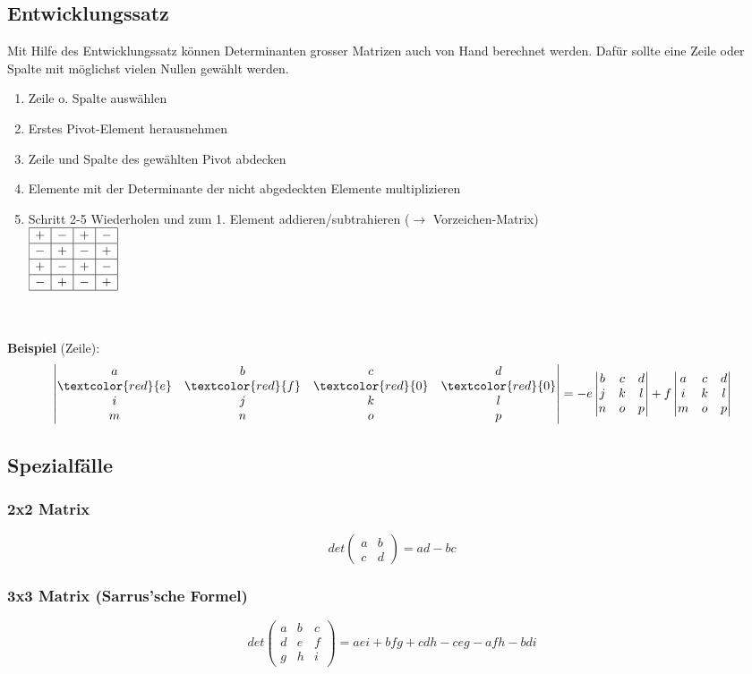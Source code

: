 \subsection{Entwicklungssatz}
Mit Hilfe des Entwicklungssatz können Determinanten grosser Matrizen auch von Hand berechnet werden. Dafür sollte eine Zeile oder Spalte mit möglichst vielen Nullen gewählt werden.
\begin{enumerate}[nosep]
	\item Zeile o. Spalte auswählen
	\item Erstes Pivot-Element herausnehmen
	\item Zeile und Spalte des gewählten Pivot abdecken
	\item Elemente mit der Determinante der nicht abgedeckten Elemente multiplizieren
	\item Schritt 2-5 Wiederholen und zum 1. Element addieren/subtrahieren ($\rightarrow$ Vorzeichen-Matrix) \\
	$\begin{array}{|c|c|c|c|}
		\hline
		+ & - & + & - \\ \hline
		- & + & - & + \\ \hline
		+ & - & + & - \\ \hline
		- & + & - & + \\ \hline
	\end{array}$
\end{enumerate}

\noindent \\ \\ \textbf{Beispiel} (Zeile): 
\[
	\begin{vmatrix}
		a & b & c & d \\
		\textcolor{red}{e} & \textcolor{red}{f} & \textcolor{red}{0} & \textcolor{red}{0} \\
		i & j & k & l \\
		m & n & o & p
	\end{vmatrix} = -e
	\begin{vmatrix}
		b & c & d \\
		j & k & l \\
		n & o & p
	\end{vmatrix} +f
	\begin{vmatrix}
		a & c & d \\
		i & k & l \\
		m & o & p
	\end{vmatrix}
\]

\subsection{Spezialfälle}
\subsubsection{2x2 Matrix}
\[
	det\begin{pmatrix}
		a & b \\
		c & d
	\end{pmatrix} = ad - bc
\]

\subsubsection{3x3 Matrix (Sarrus'sche Formel)}
\[
det\begin{pmatrix}
	a & b & c \\
	d & e & f \\
	g & h & i
\end{pmatrix} = aei + bfg + cdh - ceg - afh - bdi
\]
